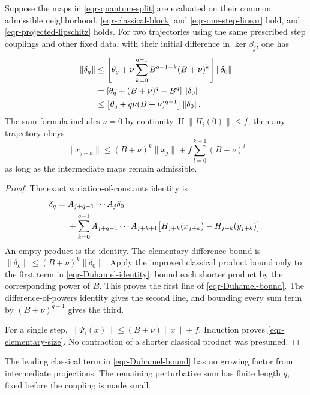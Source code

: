 \begin{lemma}
\label{eqr-Duhamel-lemma}
Suppose the maps in \eqref{eqr-quantum-split} are evaluated on
their common admissible neighborhood,
\eqref{eqr-classical-block} and \eqref{eqr-one-step-linear} hold,
and \eqref{eqr-projected-lipschitz} holds. For two trajectories
using the same prescribed step couplings and other fixed data,
with their initial difference in $\ker\beta_j$, one has
\begin{align}
 \|\delta_q\|
 &\le\left[
 \theta_q+\nu\sum_{k=0}^{q-1}
                    B^{q-1-k}(B+\nu)^k\right]\|\delta_0\|
       \notag\\
 &=\left[\theta_q+(B+\nu)^q-B^q\right]\|\delta_0\|
       \notag\\
 &\le\left[\theta_q+q\nu(B+\nu)^{q-1}\right]\|\delta_0\|.
 \label{eqr-Duhamel-bound}
\end{align}
The sum formula includes $\nu=0$ by continuity.
If $\|H_i(0)\|\le f$, then any trajectory obeys
\begin{equation}
 \|x_{j+k}\|\le(B+\nu)^k\|x_j\|
                     +f\sum_{l=0}^{k-1}(B+\nu)^l
 \label{eqr-elementary-size}
\end{equation}
as long as the intermediate maps remain admissible.
\end{lemma}
\begin{proof}
The exact variation-of-constants identity is
\begin{align}
 \delta_q={}&A_{j+q-1}\cdots A_j\delta_0 \notag\\
 &+\sum_{k=0}^{q-1}A_{j+q-1}\cdots A_{j+k+1}
   \bigl[H_{j+k}(x_{j+k})-H_{j+k}(y_{j+k})\bigr].
 \label{eqr-Duhamel-identity}
\end{align}
An empty product is the identity. The elementary difference bound
is $\|\delta_k\|\le(B+\nu)^k\|\delta_0\|$.
Apply the improved classical product bound only to the first term
in \eqref{eqr-Duhamel-identity}; bound each shorter product by the
corresponding power of $B$. This proves the first line of
\eqref{eqr-Duhamel-bound}. The difference-of-powers identity gives
the second line, and bounding every sum term by
$(B+\nu)^{q-1}$ gives the third.

For a single step,
$\|\Psi_i(x)\|\le(B+\nu)\|x\|+f$.
Induction proves \eqref{eqr-elementary-size}.
No contraction of a shorter classical product was presumed.
\end{proof}

The leading classical term in \eqref{eqr-Duhamel-bound} has no
growing factor from intermediate projections. The remaining
perturbative sum has finite length $q$, fixed before the coupling
is made small.


